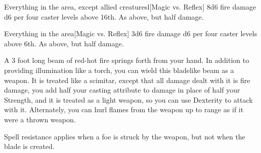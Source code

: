 \begin{spellheader}
\end{spellheader}
\begin{spelleffects}
    \begin{spelltargets}{Everything in the area, except allied creatures}l[Magic vs. Reflex]
        \spellsuccess 8d6 fire damage \add d6 per four caster levels above 16th.
        \spellfailure As above, but half damage.
    \end{spelltargets}
\end{spelleffects}
\begin{spellfooter}
    
\end{spellfooter}

\begin{spellheader}
\end{spellheader}
\begin{spelleffects}
    \begin{spelltargets}{Everything in the area}[Magic vs. Reflex]
        \spellsuccess 3d6 fire damage \add d6 per four caster levels above 6th.
        \spellfailure As above, but half damage.
    \end{spelltargets}
\end{spelleffects}
\begin{spellfooter}
    \spellnotes \destructivespellnotes

    \firespellnotes
\end{spellfooter}

\begin{spellheader}
\end{spellheader}
\begin{spelleffects}
    \spelldur{\durlong \dismissable}
    \spelleffect A 3 foot long beam of red-hot fire springs forth from your hand. In addition to providing illumination like a torch, you can wield this bladelike beam as a weapon. It is treated like a scimitar, except that all damage dealt with it is fire damage, you add half your casting attribute to damage in place of half your Strength, and it is treated as a light weapon, so you can use Dexterity to attack with it. Alternately, you can hurl flames from the weapon up to \rngmed range as if it were a thrown weapon.
    \spellnotes \firespellnotes

    Spell resistance applies when a foe is struck by the weapon, but not when the blade is created.
\end{spelleffects}
\begin{spellfooter}
    
\end{spellfooter}

